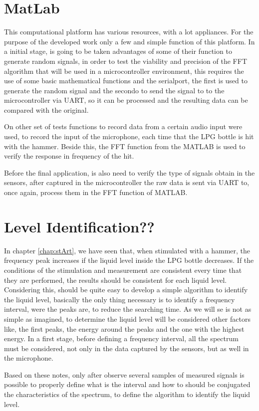 \section{MatLab}
This computational platform has various resources, with a lot appliances. For the purpose of the developed work only a few and simple function of this platform. In a initial stage, is going to be taken advantages of some of their function to generate random signals, in order to test the viability and precision of the FFT algorithm that will be used in a microcontroller environment, this requires the use of some basic mathematical functions and the serialport, the first is used to generate the random signal and the secondo to send the signal to to the microcontroller via UART, so it can be processed and the resulting data can be compared with the original. 

On other set of tests functions to record data from a certain audio input were used, to record the input of the microphone, each time that the LPG bottle is hit with the hammer. Beside this, the FFT function from the MATLAB is used to verify the response in frequency of the hit. 

Before the final application, is also need to verify the type of signals obtain in the sensors, after captured in the microcontroller the raw data is sent via UART to, once again, process them in the FFT function of MATLAB. 
\section{Level Identification??}
In chapter \ref{chap:stArt}, we have seen that, when stimulated with a hammer, the frequency peak increases if the liquid level inside the LPG bottle decreases. If the conditions of the stimulation and measurement are consistent every time that they are performed, the results should be consistent for each liquid level. Considering this, should be quite easy to develop a simple algorithm to identify the liquid level, basically the only thing necessary is to identify a frequency interval, were the peaks are, to reduce the searching time. As we will se is not as simple as imagined, to determine the liquid level will be considered other factors like, the first peaks, the energy around the peaks and the one with the highest energy. In a first stage, before defining a frequency interval, all the spectrum must be considered, not only in the data captured by the sensors, but as well in the microphone. 

Based on these notes, only after observe several samples of measured signals is possible to properly define what is the interval and how to should be conjugated the characteristics of the spectrum, to define the algorithm to identify the liquid level. 
